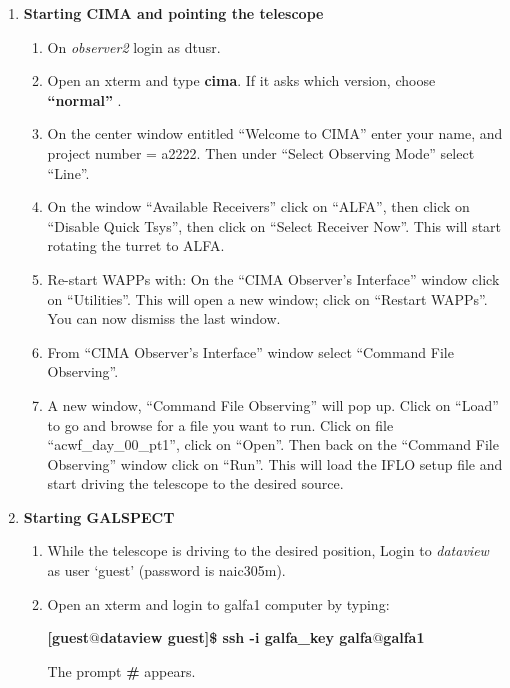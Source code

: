 \begin{enumerate}

\item {\bf Starting CIMA and pointing the telescope}

\begin{enumerate}
\item On {\it observer2} login as dtusr. 
\item Open an xterm and type {\bf cima}. If it asks which version,
choose {\bf``normal''} . 
\item On the center window entitled ``Welcome to CIMA''
enter your name, and project number = a2222. Then under ``Select Observing Mode'' select ``Line''.
\item On the window ``Available Receivers''
click on ``ALFA'', then click on ``Disable Quick Tsys'', then click on
``Select Receiver Now''.
This will start rotating the turret to ALFA.

\item Re-start WAPPs with:
On the ``CIMA Observer's Interface'' window click on ``Utilities''. This will open a new window; click on ``Restart WAPPs''. You can now dismiss the last window.

\item From ``CIMA Observer's Interface'' window select ``Command File
Observing''. 

\item A new window, ``Command File Observing'' will pop up.
Click on ``Load'' to go and browse for a file you want to
run. Click on file ``acwf\_day\_00\_pt1'', click on ``Open''.
Then back on  the ``Command File Observing'' window
click on ``Run''. 
This will load the IFLO setup file and start driving the telescope to
the desired source.


\end{enumerate}


\item {\bf Starting GALSPECT}

\begin{enumerate}
\item While the telescope is driving to the desired position, 
Login to {\it dataview} as user `guest' (password is naic305m). 

\item Open an xterm and login to galfa1 computer by typing:

{\bf
[guest$@$dataview guest]\$  ssh -i galfa\_key galfa$@$galfa1 
}

The prompt {\bf \#} appears.


\end{enumerate}
\end{enumerate}
